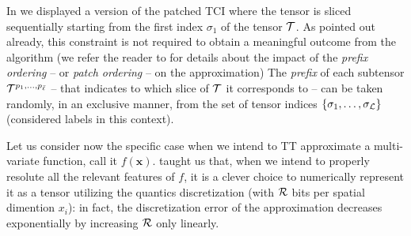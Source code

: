 In  we displayed a version of the patched TCI where the tensor is sliced sequentially starting from the first index $\sigma_1$ of the tensor $\mathcal{T}$. As pointed out already, this constraint is not required to obtain a meaningful outcome from the algorithm (we refer the reader to  for details about the impact of the \textit{prefix ordering} -- or \textit{patch ordering} -- on the approximation) The \textit{prefix} of each subtensor $\mathcal{T}^{p_1,\dots,p_{\bar \ell}}$ -- that indicates to which slice of $\mathcal{T}$ it corresponds to -- can be taken randomly, in an exclusive manner, from the set of tensor indices $\{\sigma_1,\dots,\sigma_{\mathcal{L}}\}$ (considered labels in this context).

Let us consider now the specific case when we intend to TT approximate a multi-variate function, call it $f(\boldsymbol{x})$.  taught us that, when we intend to properly resolute all the relevant features of $f$, it is a clever choice to numerically represent it as a tensor utilizing the quantics discretization (with $\mathcal{R}$ bits per spatial dimention $x_i$): in fact, the discretization error of the approximation decreases exponentially by increasing $\mathcal{R}$ only linearly. 

